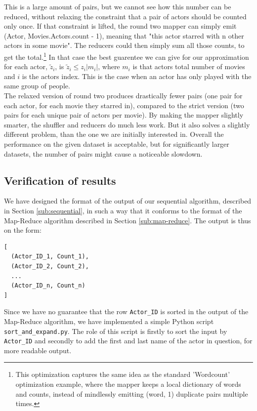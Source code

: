 \documentclass[a4paper,11pt]{article}
\begin{document}
This is a large amount of pairs, but we cannot see how this number can be reduced, without relaxing the constraint that a pair of actors should be counted only once. If that constraint is lifted, the round two mapper can simply emit (Actor, Movies.Actors.count - 1), meaning that "this actor starred with n other actors in some movie". The reducers could then simply sum all those counts, to get the total.\footnote{This optimization captures the same idea as the standard 'Wordcount' optimization example, where the mapper keeps a local dictionary of words and counts, instead of mindlessly emitting (word, 1) duplicate pairs multiple times.}
In that case the best guarentee we can give for our approximation for each actor, $\tilde{z}_i$, is $\tilde{z}_i \leq z_i |m_i|$, where $m_i$ is that actors total number of movies and $i$ is the actors index. This is the case when an actor has only played with the same group of people. 
\\

The relaxed version of round two produces drastically fewer pairs (one pair for each actor, for each movie they starred in), compared to the strict version (two pairs for each unique pair of actors per movie). By making the mapper slightly smarter, the shuffler and reducers do much less work. But it also solves a slightly different problem, than the one we are initially interested in. Overall the performance on the given dataset is acceptable, but for significantly larger datasets, the number of pairs might cause a noticeable slowdown. 


\subsection{Verification of results}
\label{sub:verification}
We have designed the format of the output of our sequential algorithm, described in Section \ref{sub:sequential}, in such a way that it conforms to the format of the Map-Reduce algorithm described in Section \ref{sub:map-reduce}. 
The output is thus on the form:
\begin{verbatim}
[ 
  (Actor_ID_1, Count_1),
  (Actor_ID_2, Count_2),
  ...
  (Actor_ID_n, Count_n)
]
\end{verbatim}
Since we have no guarantee that the row \texttt{Actor\_ID} is sorted in the output of the Map-Reduce algorithm, we have implemented a simple Python script \texttt{sort\_and\_expand.py}. 
The role of this script is firstly to sort the input by \texttt{Actor\_ID} and secondly to add the first and last name of the actor in question, for more readable output.
\end{document}
